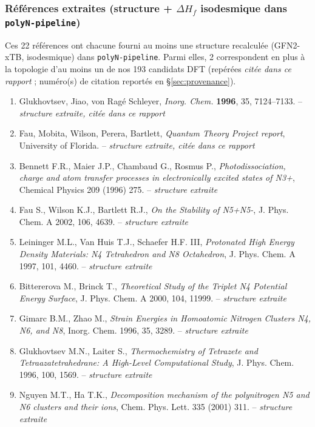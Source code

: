 \subsubsection*{R\'ef\'erences extraites (structure + $\Delta H_f$ isodesmique dans \texttt{polyN-pipeline})}
Ces 22 r\'ef\'erences ont chacune fourni au moins une structure recalcul\'ee (GFN2-xTB, isodesmique) dans \texttt{polyN-pipeline}. Parmi elles, 2 correspondent en plus \`a la topologie d'au moins un de nos 193 candidats DFT (rep\'er\'ees \emph{cit\'ee dans ce rapport} ; num\'ero(s) de citation report\'es en \S\ref{sec:provenance}).
\begin{enumerate}[leftmargin=1.6cm,itemsep=3pt]
\item Glukhovtsev, Jiao, von Rag\'e Schleyer, \emph{Inorg. Chem.} \textbf{1996}, 35, 7124--7133. -- \textit{structure extraite, cit\'ee dans ce rapport}
\item Fau, Mobita, Wilson, Perera, Bartlett, \emph{Quantum Theory Project report}, University of Florida. -- \textit{structure extraite, cit\'ee dans ce rapport}
\item Bennett F.R., Maier J.P., Chambaud G., Rosmus P., \emph{Photodissociation, charge and atom transfer processes in electronically excited states of N3+}, Chemical Physics 209 (1996) 275. -- \textit{structure extraite}
\item Fau S., Wilson K.J., Bartlett R.J., \emph{On the Stability of N5+N5-}, J. Phys. Chem. A 2002, 106, 4639. -- \textit{structure extraite}
\item Leininger M.L., Van Huis T.J., Schaefer H.F. III, \emph{Protonated High Energy Density Materials: N4 Tetrahedron and N8 Octahedron}, J. Phys. Chem. A 1997, 101, 4460. -- \textit{structure extraite}
\item Bittererova M., Brinck T., \emph{Theoretical Study of the Triplet N4 Potential Energy Surface}, J. Phys. Chem. A 2000, 104, 11999. -- \textit{structure extraite}
\item Gimarc B.M., Zhao M., \emph{Strain Energies in Homoatomic Nitrogen Clusters N4, N6, and N8}, Inorg. Chem. 1996, 35, 3289. -- \textit{structure extraite}
\item Glukhovtsev M.N., Laiter S., \emph{Thermochemistry of Tetrazete and Tetraazatetrahedrane: A High-Level Computational Study}, J. Phys. Chem. 1996, 100, 1569. -- \textit{structure extraite}
\item Nguyen M.T., Ha T.K., \emph{Decomposition mechanism of the polynitrogen N5 and N6 clusters and their ions}, Chem. Phys. Lett. 335 (2001) 311. -- \textit{structure extraite}

\end{enumerate}
